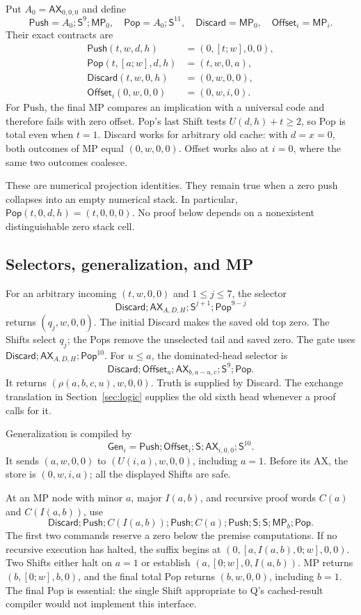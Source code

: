 \documentclass[11pt,letterpaper]{article}
\newcommand{\AX}{\mathsf{AX}}
\newcommand{\MP}{\mathsf{MP}}
\newcommand{\Shift}{\mathsf S}
\newcommand{\Push}{\mathsf{Push}}
\newcommand{\Pop}{\mathsf{Pop}}
\newcommand{\Discard}{\mathsf{Discard}}
\newcommand{\Offset}{\mathsf{Offset}}
\newcommand{\Gen}{\mathsf{Gen}}
\begin{document}
Put $A_0=\AX_{0,0,0}$ and define
\[
\Push=A_0;\Shift^9;\MP_0,\quad
\Pop=A_0;\Shift^{11},\quad
\Discard=\MP_0,\quad\Offset_i=\MP_i.
\]
Their exact contracts are
\begin{align*}
\Push(t,w,d,h)&=(0,[t;w],0,0),\\
\Pop(t,[a;w],d,h)&=(t,w,0,a),\\
\Discard(t,w,0,h)&=(0,w,0,0),\\
\Offset_i(0,w,0,0)&=(0,w,i,0).
\end{align*}
For Push, the final MP compares an implication with a universal code and
therefore fails with zero offset. Pop's last Shift tests $U(d,h)+t\ge2$,
so Pop is total even when $t=1$. Discard works for arbitrary old cache:
with $d=x=0$, both outcomes of MP equal $(0,w,0,0)$. Offset works also
at $i=0$, where the same two outcomes coalesce.

These are numerical projection identities. They remain true when a zero
push collapses into an empty numerical stack. In particular,
$\Pop(t,0,d,h)=(t,0,0,0)$. No proof below depends on a nonexistent
distinguishable zero stack cell.

\subsection{Selectors, generalization, and MP}

For an arbitrary incoming $(t,w,0,0)$ and $1\le j\le7$, the selector
\[
\Discard;\AX_{A,D,H};\Shift^{j+1};\Pop^{9-j}
\]
returns $(q_j,w,0,0)$. The initial Discard makes the saved old top zero.
The Shifts select $q_j$; the Pops remove the unselected tail and saved zero.
The gate uses $\Discard;\AX_{A,D,H};\Pop^{10}$.
For $u\le a$, the dominated-head selector is
\[
\Discard;\Offset_u;\AX_{b,a-u,c};\Shift^9;\Pop.
\]
It returns $(\rho(a,b,c,u),w,0,0)$. Truth is supplied by Discard.
The exchange translation in Section~\ref{sec:logic} supplies the old
sixth head whenever a proof calls for it.

Generalization is compiled by
\[
\Gen_i=\Push;\Offset_i;\Shift;\AX_{i,0,0};\Shift^{10}.
\]
It sends $(a,w,0,0)$ to $(U(i,a),w,0,0)$, including $a=1$.
Before its AX, the store is $(0,w,i,a)$; all the displayed Shifts are safe.

At an MP node with minor $a$, major $I(a,b)$, and recursive proof words
$C(a)$ and $C(I(a,b))$, use
\[
\Discard;\Push;C(I(a,b));\Push;C(a);\Push;
                    \Shift;\Shift;\MP_b;\Pop.
\]
The first two commands reserve a zero below the premise computations.
If no recursive execution has halted, the suffix begins at
$(0,[a,I(a,b),0;w],0,0)$. Two Shifts either halt on $a=1$ or establish
$(a,[0;w],0,I(a,b))$. MP returns $(b,[0;w],b,0)$, and the final total Pop
returns $(b,w,0,0)$, including $b=1$. The final Pop is essential:
the single Shift appropriate to Q's cached-result compiler would not
implement this interface.
\end{document}
